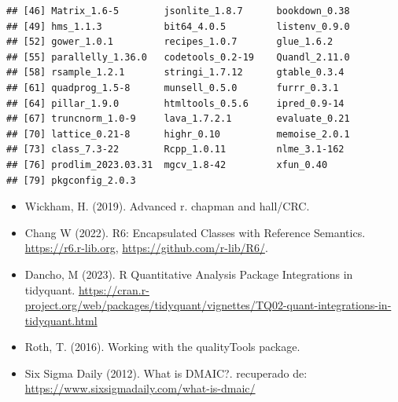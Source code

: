 \documentclass[
]{book}
\providecommand{\tightlist}{%
  \setlength{\itemsep}{0pt}\setlength{\parskip}{0pt}}
\begin{document}
\begin{verbatim}
## [46] Matrix_1.6-5        jsonlite_1.8.7      bookdown_0.38      
## [49] hms_1.1.3           bit64_4.0.5         listenv_0.9.0      
## [52] gower_1.0.1         recipes_1.0.7       glue_1.6.2         
## [55] parallelly_1.36.0   codetools_0.2-19    Quandl_2.11.0      
## [58] rsample_1.2.1       stringi_1.7.12      gtable_0.3.4       
## [61] quadprog_1.5-8      munsell_0.5.0       furrr_0.3.1        
## [64] pillar_1.9.0        htmltools_0.5.6     ipred_0.9-14       
## [67] truncnorm_1.0-9     lava_1.7.2.1        evaluate_0.21      
## [70] lattice_0.21-8      highr_0.10          memoise_2.0.1      
## [73] class_7.3-22        Rcpp_1.0.11         nlme_3.1-162       
## [76] prodlim_2023.03.31  mgcv_1.8-42         xfun_0.40          
## [79] pkgconfig_2.0.3
\end{verbatim}

\begin{itemize}
\tightlist
\item
  Wickham, H. (2019). Advanced r. chapman and hall/CRC.
\item
  Chang W (2022). R6: Encapsulated Classes with Reference Semantics. \url{https://r6.r-lib.org}, \url{https://github.com/r-lib/R6/}.
\item
  Dancho, M (2023). R Quantitative Analysis Package Integrations in tidyquant. \url{https://cran.r-project.org/web/packages/tidyquant/vignettes/TQ02-quant-integrations-in-tidyquant.html}
\item
  Roth, T. (2016). Working with the qualityTools package.
\item
  Six Sigma Daily (2012). What is DMAIC?. recuperado de: \url{https://www.sixsigmadaily.com/what-is-dmaic/}
\end{itemize}

  
\end{document}
